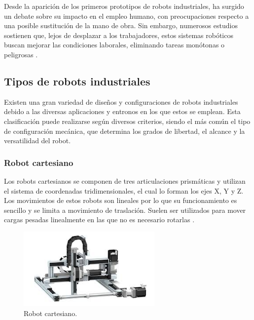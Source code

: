 Desde la aparición de los primeros prototipos de robots industriales, ha surgido un debate sobre su impacto en el empleo humano, con preocupaciones respecto a una posible sustitución de la mano de obra. Sin embargo, numerosos estudios sostienen que, lejos de desplazar a los trabajadores, estos sistemas robóticos buscan mejorar las condiciones laborales, eliminando tareas monótonas o peligrosas \cite{info_robotica_industrial_2}. 

\subsection{Tipos de robots industriales}
 
Existen una gran variedad de diseños y configuraciones de robots industriales debido a las diversas aplicaciones y entronos en los que estos se emplean. Esta clasificación puede realizarse según diversos criterios, siendo el más común el tipo de configuración mecánica, que determina los grados de libertad, el alcance y la versatilidad del robot.

\subsubsection{Robot cartesiano}

Los robots cartesianos se componen de tres articulaciones prismáticas y utilizan el sistema de coordenadas tridimensionales, el cual lo forman los ejes X, Y y Z. Los movimientos de estos robots son lineales por lo que su funcionamiento es sencillo y se limita a movimiento de traslación. Suelen ser utilizados para mover cargas pesadas linealmente en las que no es necesario rotarlas \cite{tipos_robots_1}. 

\begin{figure} [h!]
  \begin{center}
    \includegraphics[width=7cm]{figs/robot_cartesiano}
  \end{center}
  \caption{\centering Robot cartesiano.}
  \label{fig:robot_cartesiano}
\end{figure} 


